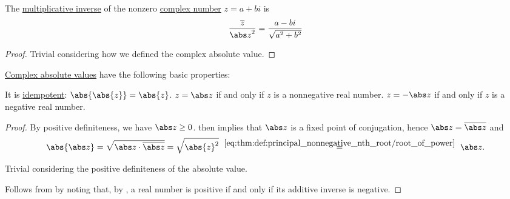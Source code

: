 \begin{proposition}\label{thm:complex_multiplicative_inverse}
  The \hyperref[def:semiring]{multiplicative inverse} of the nonzero \hyperref[def:complex_numbers]{complex number} \( z = a + bi \) is
  \begin{equation}\label{eq:thm:complex_multiplicative_inverse}
    \frac {\oline z} {{\abs z}^2} = \frac {a - bi} {\sqrt{a^2 + b^2}}
  \end{equation}
\end{proposition}
\begin{proof}
  Trivial considering how we defined the complex absolute value.
\end{proof}

\begin{proposition}\label{thm:def:complex_absolute_value}
  \hyperref[def:complex_absolute_value]{Complex absolute values} have the following basic properties:
  \begin{thmenum}
     It is \hyperref[def:idempotent_function]{idempotent}: \( \abs{\abs{z}} = \abs{z} \).
     \( z = \abs z \) if and only if \( z \) is a nonnegative real number.
     \( z = -\abs z \) if and only if \( z \) is a negative real number.
  \end{thmenum}
\end{proposition}
\begin{proof}
   By positive definiteness, we have \( \abs z \geq 0 \).  then implies that \( \abs z \) is a fixed point of conjugation, hence \( \abs z = \oline{\abs z} \) and
  \begin{equation*}
    \abs{\abs z}
    =
    \sqrt{ \abs z \cdot \oline{\abs z} }
    =
    \sqrt { \abs{z}^2 }
    \reloset {\eqref{eq:thm:def:principal_nonnegative_nth_root/root_of_power}} =
    \abs z.
  \end{equation*}

   Trivial considering the positive definiteness of the absolute value.

   Follows from  by noting that, by , a real number is positive if and only if its additive inverse is negative.
\end{proof}

